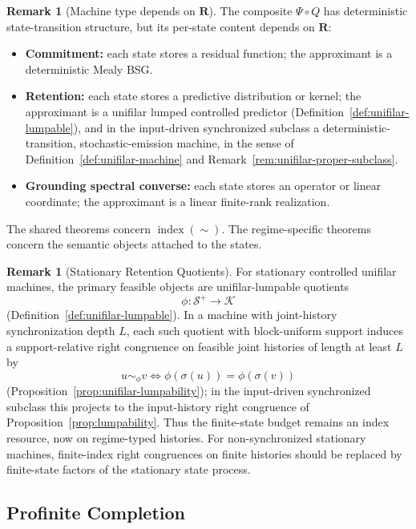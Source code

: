 \documentclass[12pt]{article}
\theoremstyle{definition}
\newtheorem{remark}[theorem]{Remark}
\newcommand{\Splus}{\mathcal S^{+}}
\begin{document}
\begin{remark}[Machine type depends on $\mathbf R$]
\label{rem:realization-types}
The composite $\Psi\circ Q$ has deterministic state-transition structure, but
its per-state content depends on $\mathbf R$:
\begin{itemize}[nosep]
\item \textbf{Commitment:} each state stores a residual function; the
approximant is a deterministic Mealy BSG.
\item \textbf{Retention:} each state stores a predictive distribution or
kernel; the approximant is a unifilar lumped controlled predictor
(Definition~\ref{def:unifilar-lumpable}), and in the input-driven synchronized
subclass a deterministic-transition, stochastic-emission machine, in the sense
of Definition~\ref{def:unifilar-machine} and
Remark~\ref{rem:unifilar-proper-subclass}.
\item \textbf{Grounding spectral converse:} each state stores an operator or
linear coordinate; the approximant is a linear finite-rank realization.
\end{itemize}
The shared theorems concern $\operatorname{index}(\sim)$.  The
regime-specific theorems concern the semantic objects attached to the states.
\end{remark}

\begin{remark}[Stationary Retention Quotients]
\label{rem:schema-stationary-retention}
For stationary controlled unifilar machines, the primary feasible objects are
unifilar-lumpable quotients
\[
\phi:\Splus\to\mathcal K
\]
(Definition~\ref{def:unifilar-lumpable}).  In a machine with joint-history
synchronization depth $L$, each such quotient with block-uniform support
induces a support-relative right congruence on feasible joint histories of
length at least $L$ by
\[
u\sim_\phi v
\iff
\phi(\sigma(u))=\phi(\sigma(v))
\]
(Proposition~\ref{prop:unifilar-lumpability}); in the input-driven
synchronized subclass this projects to the input-history right congruence of
Proposition~\ref{prop:lumpability}.  Thus the finite-state budget remains an
index resource, now on regime-typed histories.  For non-synchronized
stationary machines, finite-index right congruences on finite histories should
be replaced by finite-state factors of the stationary state process.
\end{remark}

\subsection{Profinite Completion}
\label{subsec:profinite-completion}
\end{document}
